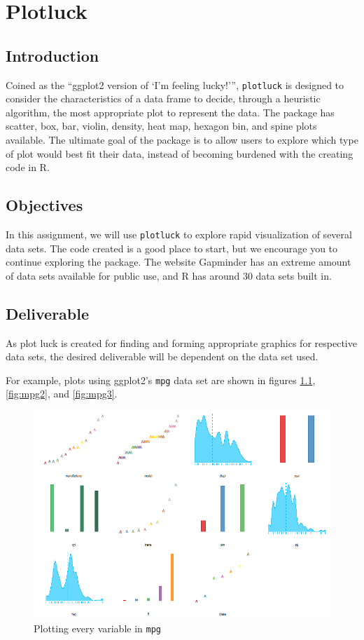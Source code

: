 \chapter{Plotluck}

\section{Introduction}

Coined as the ``ggplot2 version of `I'm feeling lucky!''', \texttt{plotluck} is designed to consider the characteristics of a data frame to decide, through a heuristic algorithm, the most appropriate plot to represent the data.
The package has scatter, box, bar, violin, density, heat map, hexagon bin, and spine plots available.
The ultimate goal of the package is to allow users to explore which type of plot would best fit their data, instead of becoming burdened with the creating code in R.

\section{Objectives}
In this assignment, we will use \texttt{plotluck} to explore rapid visualization of several data sets.
The code created is a good place to start, but we encourage you to continue exploring the package.
The website Gapminder has an extreme amount of data sets available for public use, and R has around 30 data sets built in.

\section{Deliverable}
As plot luck is created for finding and forming appropriate graphics for respective data sets, the desired deliverable will be dependent on the data set used.

For example, plots using ggplot2's \texttt{mpg} data set are shown in figures \ref{fig:mpg1}, \ref{fig:mpg2}, and \ref{fig:mpg3}.

\begin{figure}[htbp!]
    \centering
    \includegraphics[width=.5\textwidth]{pictures/plotluck/mpgall}
    \caption{Plotting every variable in \texttt{mpg}}
    \label{fig:mpg1}
\end{figure}

